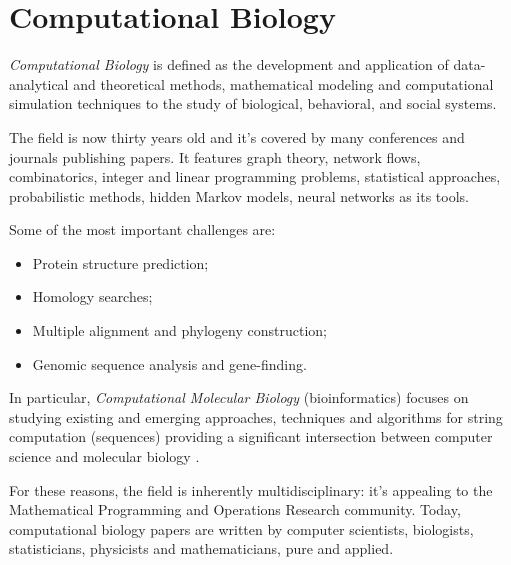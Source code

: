 \section{Computational Biology} 
 
\textit{Computational Biology} is defined as the development and application of data-analytical and theoretical methods, mathematical modeling and computational simulation techniques to the study of biological, behavioral, and social systems\cite{1}.

The field is now thirty years old and it's covered by many conferences and journals publishing papers. It features graph theory, network flows, combinatorics, integer and linear programming problems, statistical approaches, probabilistic methods, hidden Markov models, neural networks as its tools.

Some of the most important challenges are\cite{Searls19983}:
\begin{itemize}
\item Protein structure prediction;
\item Homology searches;
\item Multiple alignment and phylogeny construction;
\item Genomic sequence analysis and gene-finding.
\end{itemize}

In particular, \textit{Computational Molecular Biology} (bioinformatics) focuses on studying existing and emerging approaches, techniques and algorithms for string computation (sequences) providing a significant intersection between computer science and molecular biology \cite{Gusfield:1997:AST:262228}.

For these reasons, the field is inherently multidisciplinary: it's appealing to the Mathematical Programming and Operations Research community. 
Today, computational biology papers are written by computer scientists, biologists, statisticians, physicists and mathematicians, pure and applied.

